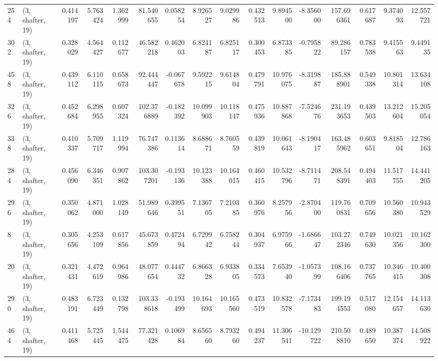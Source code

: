 \begin{tabular}{llrrrrrrrrrrrrrr}
254 &  (3, shafter, 19) &   0.414197 &   5.763424 &   1.362999 &    81.540655 &   0.058254 &   8.926527 &   9.029986 &  0.432513 &   9.894500 &  -8.356000 &   157.696361 &  0.617687 &   9.374093 &  12.557721 \\
302 &  (3, shafter, 19) &   0.328029 &   4.564427 &   0.112677 &    46.582218 &   0.462003 &   6.824187 &   6.825117 &  0.300453 &   6.873385 &  -0.795822 &    89.286157 &  0.783538 &   9.415563 &   9.449135 \\
458 &  (3, shafter, 19) &   0.439112 &   6.110115 &   0.658673 &    92.444447 &  -0.067678 &   9.592215 &   9.614804 &  0.479791 &  10.976075 &  -8.319887 &   185.888901 &  0.549338 &  10.801314 &  13.634108 \\
326 &  (3, shafter, 19) &   0.452684 &   6.298955 &   0.607324 &   102.376889 &  -0.182392 &  10.099903 &  10.118147 &  0.475936 &  10.887868 &  -7.524676 &   231.193653 &  0.439503 &  13.212604 &  15.205054 \\
338 &  (3, shafter, 19) &   0.410337 &   5.709717 &   1.119994 &    76.747386 &   0.113614 &   8.688671 &   8.760559 &  0.439819 &  10.061643 &  -8.190417 &   163.485962 &  0.603651 &   9.818504 &  12.786163 \\
284 &  (3, shafter, 19) &   0.456090 &   6.346351 &   0.907862 &   103.307201 &  -0.193136 &  10.123388 &  10.164015 &  0.460415 &  10.532796 &  -8.711471 &   208.548391 &  0.494403 &  11.517755 &  14.441205 \\
296 &  (3, shafter, 19) &   0.350062 &   4.871000 &   1.028149 &    51.989646 &   0.399551 &   7.136705 &   7.210385 &  0.360976 &   8.257956 &  -2.870400 &   119.760831 &  0.709656 &  10.560380 &  10.943529 \\
8   &  (3, shafter, 19) &   0.305656 &   4.253109 &   0.617856 &    45.673859 &   0.472494 &   6.729942 &   6.758244 &  0.304937 &   6.975966 &  -1.686647 &   103.272346 &  0.749630 &  10.021356 &  10.162300 \\
20  &  (3, shafter, 19) &   0.321431 &   4.472619 &   0.964986 &    48.077654 &   0.444732 &   6.866328 &   6.933805 &  0.334573 &   7.653940 &  -1.057399 &   108.166406 &  0.737765 &  10.346415 &  10.400308 \\
290 &  (3, shafter, 19) &   0.483191 &   6.723449 &   0.132798 &   103.338618 &  -0.193499 &  10.164693 &  10.165560 &  0.473519 &  10.832578 &  -7.173483 &   199.194553 &  0.517080 &  12.154657 &  14.113630 \\
464 &  (3, shafter, 19) &   0.411468 &   5.725445 &   1.544475 &    77.321428 &   0.106984 &   8.656560 &   8.793260 &  0.494237 &  11.306541 & -10.129722 &   210.508810 &  0.489650 &  10.387374 &  14.508922 \\

\end{tabular}
